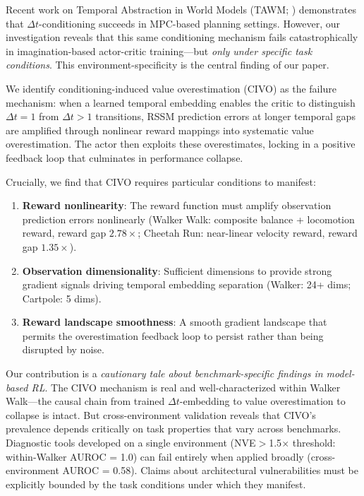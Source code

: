 \documentclass[letterpaper]{article}
\begin{document}
Recent work on Temporal Abstraction in World Models (TAWM; \citealt{nhu2025tawm}) demonstrates that $\Delta t$-conditioning succeeds in MPC-based planning settings. However, our investigation reveals that this same conditioning mechanism fails catastrophically in imagination-based actor-critic training---but \emph{only under specific task conditions}. This environment-specificity is the central finding of our paper.

We identify conditioning-induced value overestimation (CIVO) as the failure mechanism: when a learned temporal embedding enables the critic to distinguish $\Delta t=1$ from $\Delta t>1$ transitions, RSSM prediction errors at longer temporal gaps are amplified through nonlinear reward mappings into systematic value overestimation. The actor then exploits these overestimates, locking in a positive feedback loop that culminates in performance collapse.

Crucially, we find that CIVO requires particular conditions to manifest:
\begin{enumerate}
    \item \textbf{Reward nonlinearity}: The reward function must amplify observation prediction errors nonlinearly (Walker Walk: composite balance + locomotion reward, reward gap $2.78\times$; Cheetah Run: near-linear velocity reward, reward gap $1.35\times$).
    \item \textbf{Observation dimensionality}: Sufficient dimensions to provide strong gradient signals driving temporal embedding separation (Walker: 24+ dims; Cartpole: 5 dims).
    \item \textbf{Reward landscape smoothness}: A smooth gradient landscape that permits the overestimation feedback loop to persist rather than being disrupted by noise.
\end{enumerate}

Our contribution is a \emph{cautionary tale about benchmark-specific findings in model-based RL}. The CIVO mechanism is real and well-characterized within Walker Walk---the causal chain from trained $\Delta t$-embedding to value overestimation to collapse is intact. But cross-environment validation reveals that CIVO's prevalence depends critically on task properties that vary across benchmarks. Diagnostic tools developed on a single environment (NVE$>$1.5$\times$ threshold: within-Walker AUROC = 1.0) can fail entirely when applied broadly (cross-environment AUROC = 0.58). Claims about architectural vulnerabilities must be explicitly bounded by the task conditions under which they manifest.
\end{document}
